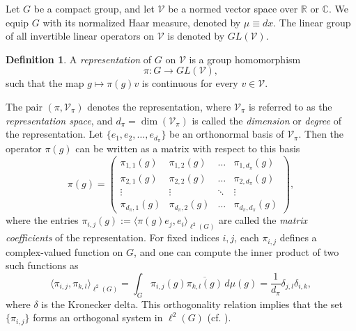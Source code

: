 \documentclass[11pt]{article}
\theoremstyle{definition}
\newtheorem{defn}[thm]{Definition}
\theoremstyle{remark}
\numberwithin{equation}{section}
\begin{document}
Let $G$ be a compact group, and let $\mathcal{V}$ be a normed vector space over $\mathbb{R}$ or $\mathbb{C}$. We equip $G$ with its normalized Haar measure, denoted by $\mu \equiv dx$. The linear group of all invertible linear operators on $\mathcal{V}$ is denoted by $GL(\mathcal{V})$.

\begin{defn}
    A \textit{representation} of $G$ on $\mathcal{V}$ is a group homomorphism
\[
\pi : G \longrightarrow GL(\mathcal{V}),
\]
such that the map $g \mapsto \pi(g)v$ is continuous for every $v \in \mathcal{V}$. 
\end{defn}
The pair $(\pi, \mathcal{V}_\pi)$ denotes the representation, where $\mathcal{V}_\pi$ is referred to as the \textit{representation space}, and $d_\pi = \dim(\mathcal{V}_\pi)$ is called the \textit{dimension} or \textit{degree} of the representation. %
Let $\{e_1, e_2, \dots, e_{d_\pi}\}$ be an orthonormal basis of $\mathcal{V}_\pi$. Then the operator $\pi(g)$ can be written as a matrix with respect to this basis
\[
\pi(g) = \begin{pmatrix}
\pi_{1,1}(g) & \pi_{1,2}(g) & \dots & \pi_{1,d_\pi}(g) \\
\pi_{2,1}(g) & \pi_{2,2}(g) & \dots & \pi_{2,d_\pi}(g) \\
\vdots & \vdots & \ddots & \vdots \\
\pi_{d_\pi,1}(g) & \pi_{d_\pi,2}(g) & \dots & \pi_{d_\pi,d_\pi}(g)
\end{pmatrix},
\]
where the entries $\pi_{i,j}(g) := \langle \pi(g) e_j, e_i \rangle_{\ell^2(G)}$ are called the \textit{matrix coefficients} of the representation.  For fixed indices $i,j$, each $\pi_{i,j}$ defines a complex-valued function on $G$, and one can compute the inner product of two such functions as
\[
\langle \pi_{i,j}, \pi_{k,l} \rangle_{\ell^2(G)} = \int_G \pi_{i,j}(g) \overline{\pi_{k,l}(g)}\, d\mu(g) = \frac{1}{d_\pi} \delta_{j,l} \delta_{i,k},
\]
where $\delta$ is the Kronecker delta. This orthogonality relation implies that the set $\{ \pi_{i,j} \}$ forms an orthogonal system in $\ell^2(G)$ (cf. \cite{Preli}).
\end{document}
